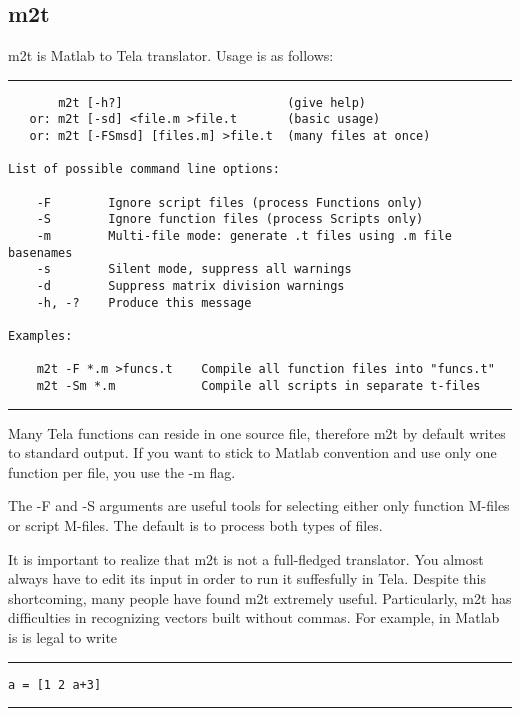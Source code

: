 \documentclass[a4paper]{article}
\begin{document}
{{\subsection{m2t\label{m2t}}



m2t is Matlab to Tela translator. Usage is as follows:

\begin{tscreen}
\par
\addvspace{\medskipamount}
\nopagebreak\hrule
\begin{verbatim}
       m2t [-h?]                       (give help)
   or: m2t [-sd] <file.m >file.t       (basic usage)
   or: m2t [-FSmsd] [files.m] >file.t  (many files at once)

List of possible command line options:

    -F        Ignore script files (process Functions only)
    -S        Ignore function files (process Scripts only)
    -m        Multi-file mode: generate .t files using .m file basenames
    -s        Silent mode, suppress all warnings
    -d        Suppress matrix division warnings
    -h, -?    Produce this message

Examples:

    m2t -F *.m >funcs.t    Compile all function files into "funcs.t"
    m2t -Sm *.m            Compile all scripts in separate t-files
\end{verbatim} 
\nopagebreak\hrule 
\addvspace{\medskipamount}
\end{tscreen}


Many Tela functions can reside in one source file, therefore m2t
by default writes to standard output. If you want to stick to Matlab
convention and use only one function per file, you use the -m flag.

The -F and -S arguments are useful tools for selecting either only
function M-files or script M-files. The default is to process both
types of files.

It is important to realize that m2t is not a full-fledged translator.
You almost always have to edit its input in order to run it suffesfully
in Tela. Despite this shortcoming, many people have found m2t extremely
useful. Particularly, m2t has difficulties in recognizing vectors built
without commas. For example, in Matlab is is legal to write

\begin{tscreen}
\par
\addvspace{\medskipamount}
\nopagebreak\hrule
\begin{verbatim}
a = [1 2 a+3]
\end{verbatim} 
\nopagebreak\hrule 
\addvspace{\medskipamount}
\end{tscreen}


}}
\end{document}
